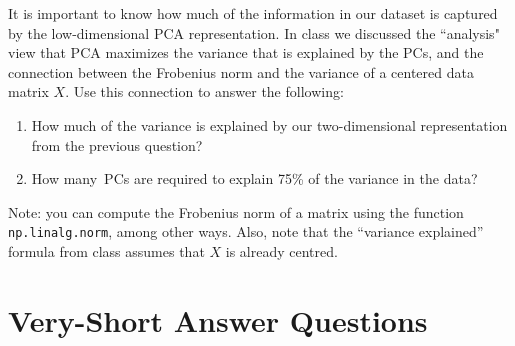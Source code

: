 \documentclass{article}
\def\blu#1{{\color{blu}#1}}
\def\enum#1{\begin{enumerate}#1\end{enumerate}}
\begin{document}
It is important to know how much of the information in our dataset is captured by the low-dimensional PCA representation.
In class we discussed the ``analysis" view that PCA maximizes the variance that is explained by the PCs, and the connection between the Frobenius norm and the variance of a centered data matrix $X$. Use this connection to answer the following:
\blu{\enum{
\item How much of the variance is explained by our two-dimensional representation from the previous question?
\item How many\ PCs are required to explain 75\% of the variance in the data?
}}
Note: you can compute the Frobenius norm of a matrix using the function \texttt{np.linalg.norm}, among other ways. Also, note that the ``variance explained'' formula from class assumes that $X$ is already centred.

\pagebreak

\section{Very-Short Answer Questions}
\end{document}
